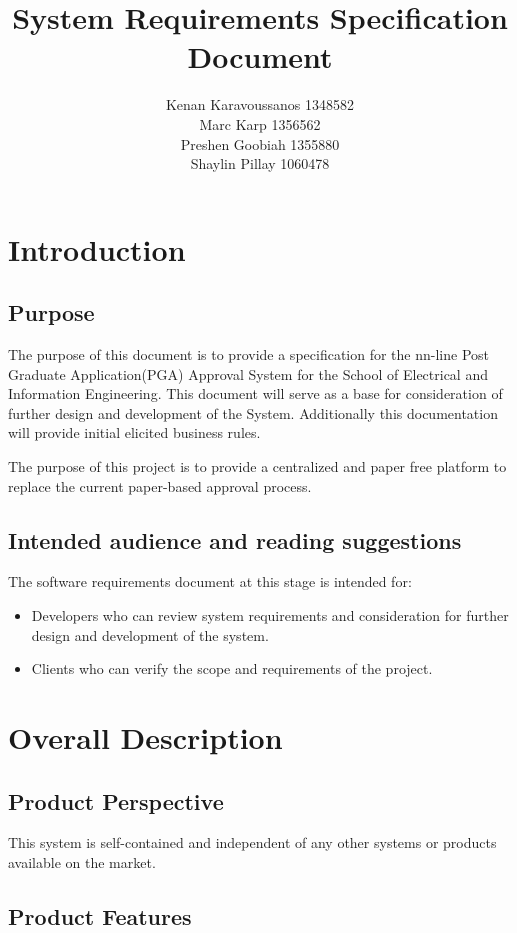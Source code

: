 \documentclass[]{article}
\title{System Requirements Specification Document}
\author{
	Kenan Karavoussanos 1348582 \\Marc Karp 1356562 \\Preshen Goobiah 1355880\\Shaylin Pillay 1060478}
\begin{document}
\maketitle
\newpage
\tableofcontents\newpage
\section{Introduction}

\subsection{Purpose}
The purpose of this document is to provide a specification for the nn-line Post Graduate Application(PGA) Approval System for the School of Electrical and Information Engineering. This document will serve as a base for consideration of further design and development of the System. Additionally this documentation will provide initial elicited business rules. 

The purpose of this project is to provide a centralized and paper free platform to replace the current paper-based approval process.  

\subsection{Intended audience and reading suggestions}

The software requirements document at this stage is intended for:
\begin{itemize}
\item	Developers who can review system requirements and consideration for further design and development of the system.
\item	Clients who can verify the scope and requirements of the project.
\end{itemize}

\section{Overall Description}

\subsection{Product Perspective}

This system is self-contained and independent of any other systems or products available on the market.


\subsection{Product Features}
\end{document}
